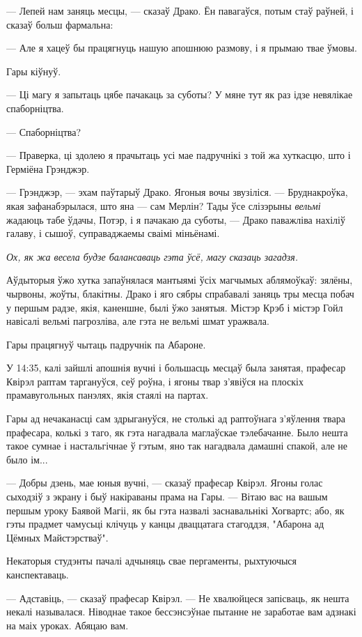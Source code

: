 --- Лепей нам заняць месцы, --- сказаў Драко. Ён павагаўся, потым стаў раўней, і 
сказаў больш фармальна:

--- Але я хацеў бы працягнуць нашую апошнюю размову, і я прымаю твае ўмовы.

Гары кіўнуў.

--- Ці магу я запытаць цябе пачакаць за суботы? У мяне тут як раз ідзе невялікае
спаборніцтва.

--- Спаборніцтва?

--- Праверка, ці здолею я прачытаць усі мае падручнікі з той жа хуткасцю, што і 
Герміёна Грэнджэр.

--- Грэнджэр, --- эхам паўтарыў Драко. Ягоныя вочы звузіліся. --- Бруднакроўка,
якая зафанабэрылася, што яна --- сам Мерлін? Тады ўсе слізэрыны  \emph{вельмі} жадаюць 
табе ўдачы, Потэр, і я пачакаю да суботы, --- Драко паважліва нахіліў галаву,
і сышоў, суправаджаемы сваімі міньёнамі.

\emph{Ох, як жа \emph{весела} будзе балансаваць гэта ўсё, магу сказаць загадзя.}

Аўдыторыя ўжо хутка запаўнялася мантыямі ўсіх магчымых аблямоўкаў: зялёны,
чырвоны, жоўты, блакітны. Драко і яго сябры спрабавалі заняць тры месца
побач у першым радзе, якія, каненшне, былі ўжо занятыя. Містэр Крэб і містэр 
Гойл навісалі вельмі пагрозліва, але гэта не вельмі шмат уражвала.

Гары працягнуў чытаць падручнік па Абароне.


\later

У 14:35, калі зайшлі апошнія вучні і большасць месцаў была занятая, прафесар Квірэл 
раптам таргануўся, сеў роўна, і ягоны твар з'явіўся на плоскіх прамавугольных 
панэлях, якія стаялі на партах.

Гары ад нечаканасці сам здрыгануўся, не столькі ад раптоўнага з'яўлення твара прафесара,
колькі з таго, як гэта нагадвала маглаўскае тэлебачанне. Было нешта такое
сумнае і настальгічнае ў гэтым, яно так нагадвала дамашні спакой, але не было ім...

--- Добры дзень, мае юныя вучні, --- сказаў прафесар Квірэл. Ягоны голас сыходзіў з
экрану і быў накіраваны прама на Гары. --- Вітаю вас на вашым першым уроку 
Баявой Магіі, як бы гэта назвалі заснавальнікі Хогвартс; або, як гэты прадмет 
чамусьці клічуць у канцы дваццатага стагоддзя, "Абарона ад Цёмных Майстэрстваў".

Некаторыя студэнты пачалі адчыняць свае пергаменты, рыхтуючыся канспектаваць.

--- Адставіць, --- сказаў прафесар Квірэл. --- Не хвалюйцеся запісваць, як нешта
некалі называлася. Ніводнае такое бессэнсэўнае пытанне не заработае вам адзнакі 
на маіх уроках. Абяцаю вам.

